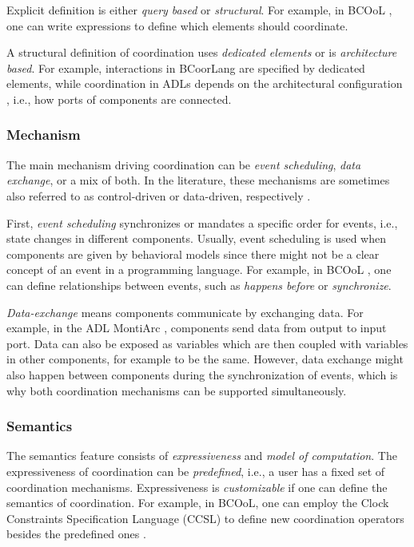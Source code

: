 \documentclass[runningheads]{llncs}
\begin{document}
Explicit definition is either \textit{query based} or \textit{structural}.
For example, in BCOoL \cite{varalarsenBCOolBehavioralCoordination2016,varalarsenBehavioralCoordinationOperator2015}, one can write expressions to define which elements should coordinate.

A structural definition of coordination uses \textit{dedicated elements} or is \textit{architecture based}.
For example, interactions in BCoorLang are specified by dedicated elements, while coordination in ADLs depends on the architectural configuration \cite{medvidovicClassificationComparisonFramework2000}, i.e., how ports of components are connected.

\subsubsection{Mechanism} The main mechanism driving coordination can be \textit{event scheduling}, \textit{data exchange}, or a mix of both.
In the literature, these mechanisms are sometimes also referred to as control-driven or data-driven, respectively \cite{papadopoulosCoordinationModelsLanguages1998,varalarsenBCOolBehavioralCoordination2016}.

First, \textit{event scheduling} synchronizes or mandates a specific order for events, i.e., state changes in different components.
Usually, event scheduling is used when components are given by behavioral models since there might not be a clear concept of an event in a programming language.
For example, in BCOoL \cite{varalarsenBehavioralCoordinationOperator2015}, one can define relationships between events, such as \textit{happens before} or \textit{synchronize}.

\textit{Data-exchange} means components communicate by exchanging data.
For example, in the ADL MontiArc \cite{haberMontiArcArchitecturalModeling2014}, components send data from output to input port.
Data can also be exposed as variables which are then coupled with variables in other components, for example to be the same. %
However, data exchange might also happen between components during the synchronization of events, which is why both coordination mechanisms can be supported simultaneously.

\subsubsection{Semantics} The semantics feature consists of \textit{expressiveness} and \textit{model of computation}.
The expressiveness of coordination can be \textit{predefined}, i.e., a user has a fixed set of coordination mechanisms.
Expressiveness is \textit{customizable} if one can define the semantics of coordination.
For example, in BCOoL, one can employ the Clock Constraints Specification Language (CCSL) \cite{andreSyntaxSemanticsClock2009} to define new coordination operators besides the predefined ones \cite{varalarsenBCOolBehavioralCoordination2016,varalarsenBehavioralCoordinationOperator2015}.
\end{document}
